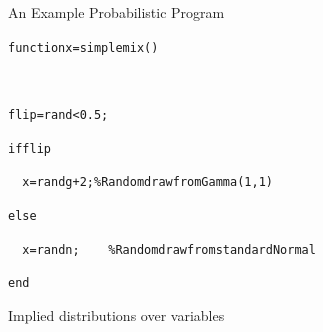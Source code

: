 \begin{frame}{An Example Probabilistic Program}
    \begin{alltt}
    function x = simplemix()
    
    \
    
	flip = rand < 0.5;

	if flip

	\ \ x = randg + 2;   \% Random draw from Gamma(1,1)
    
	else

	\ \ x = randn;    \ \ \ \ \% Random draw from standard Normal
    
	end

    \end{alltt}
	\pause
  \begin{block}{Implied distributions over variables}


\end{block}
\end{frame}
